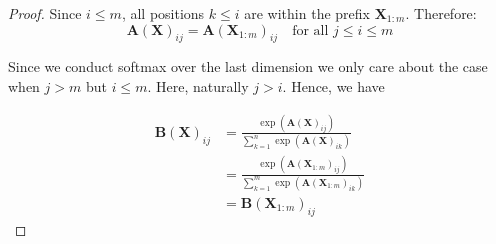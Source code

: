 \documentclass{article} %
\theoremstyle{definition}
\begin{document}
\begin{proof}


    Since $i \leq m$, all positions $k \leq i$ are within the prefix $\mathbf{X}_{1:m}$. Therefore:
    \begin{equation}
        \mathbf{A}(\mathbf{X})_{ij} = \mathbf{A}(\mathbf{X}_{1:m})_{ij} \quad \text{for all } j \leq i \leq m
    \end{equation}

    Since we conduct softmax over the last dimension we only care about the case when $j > m$ but $i \leq m$.
    Here, naturally $j > i$.
    Hence, we have

    \begin{align*}
        \mathbf{B}(\mathbf{X})_{ij} &= \frac{\exp(\mathbf{A}(\mathbf{X})_{ij})}{\sum_{k=1}^{n} \exp(\mathbf{A}(\mathbf{X})_{ik})} \\
        &= \frac{\exp(\mathbf{A}(\mathbf{X}_{1:m})_{ij})}{\sum_{k=1}^{m} \exp(\mathbf{A}(\mathbf{X}_{1:m})_{ik})} \\
        &= \mathbf{B}(\mathbf{X}_{1:m})_{ij}
    \end{align*}

\end{proof}
\end{document}
